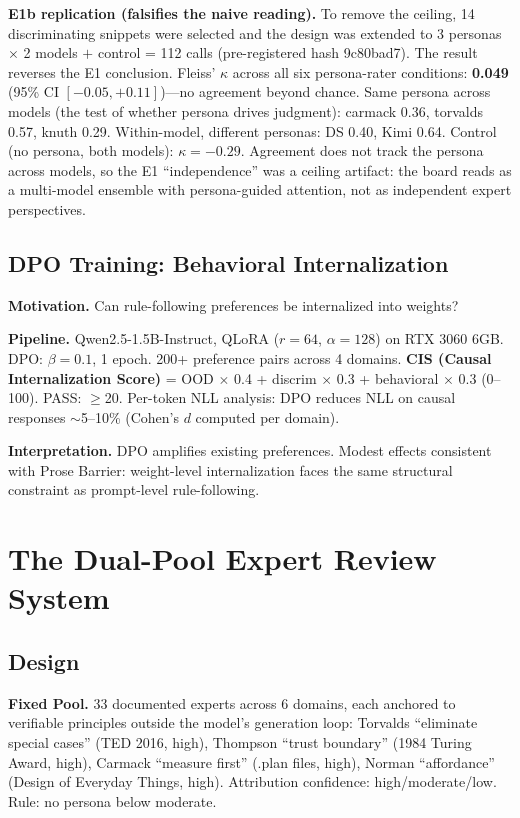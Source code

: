 \documentclass[11pt]{article}
\begin{document}
\textbf{E1b replication (falsifies the naive reading).} To remove the ceiling,
14 discriminating snippets were selected and the design was extended to 3
personas $\times$ 2 models $+$ control = 112 calls (pre-registered hash
9c80bad7). The result reverses the E1 conclusion. Fleiss' $\kappa$ across all
six persona-rater conditions: \textbf{0.049} (95\% CI $[-0.05, +0.11]$)---no
agreement beyond chance. Same persona across models (the test of whether
persona drives judgment): carmack 0.36, torvalds 0.57, knuth 0.29.
Within-model, different personas: DS 0.40, Kimi 0.64. Control (no persona,
both models): $\kappa=-0.29$. Agreement does not track the persona across
models, so the E1 ``independence'' was a ceiling artifact: the board reads as a
multi-model ensemble with persona-guided attention, not as independent expert
perspectives.

\subsection{DPO Training: Behavioral Internalization}
\label{sec:dpo}

\textbf{Motivation.} Can rule-following preferences be internalized into weights?

\textbf{Pipeline.} Qwen2.5-1.5B-Instruct, QLoRA ($r{=}64$, $\alpha{=}128$) on
RTX 3060 6GB. DPO: $\beta{=}0.1$, 1 epoch. 200+ preference pairs across 4
domains. \textbf{CIS (Causal Internalization Score)} = OOD $\times$ 0.4 + discrim
$\times$ 0.3 + behavioral $\times$ 0.3 (0--100). PASS: $\geq$20. Per-token NLL
analysis: DPO reduces NLL on causal responses $\sim$5--10\% (Cohen's $d$
computed per domain).

\textbf{Interpretation.} DPO amplifies existing preferences. Modest effects
consistent with Prose Barrier: weight-level internalization faces the same
structural constraint as prompt-level rule-following.

\section{The Dual-Pool Expert Review System}
\label{sec:dual-pool}

\subsection{Design}

\textbf{Fixed Pool.} 33 documented experts across 6 domains, each anchored to
verifiable principles outside the model's generation loop: Torvalds ``eliminate
special cases'' (TED 2016, high), Thompson ``trust boundary'' (1984 Turing
Award, high), Carmack ``measure first'' (.plan files, high), Norman
``affordance'' (Design of Everyday Things, high). Attribution confidence:
high/moderate/low. Rule: no persona below moderate.
\end{document}
